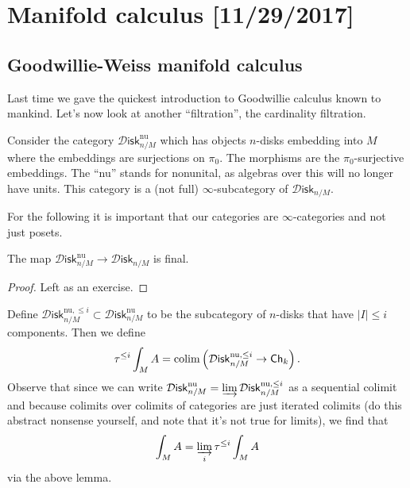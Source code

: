 \documentclass{amsart}
\begin{document}
\newpage

\section{Manifold calculus [11/29/2017]}

\subsection{Goodwillie-Weiss manifold calculus}

Last time we gave the quickest introduction to Goodwillie calculus known to mankind.
Let's now look at another ``filtration'', the cardinality filtration.

\begin{definition}
    Consider the category $\mathcal{D}\mathsf{isk}_{n/M}^\text{nu}$ which has objects
    $n$-disks embedding into $M$ where the embeddings are surjections on $\pi_0$. The
    morphisms are the $\pi_0$-surjective embeddings. The ``nu'' stands for nonunital,
    as algebras over this will no longer have units. This category is a (not full)
    $\infty$-subcategory of $\mathcal{D}\mathsf{isk}_{n/M}$.
\end{definition}

For the following it is important that our categories are $\infty$-categories and not
just posets.
\begin{lemma}
    The map $\mathcal{D}\mathsf{isk}_{n/M}^\text{nu}\to\mathcal{D}\mathsf{isk}_{n/M}$
    is final.
\end{lemma}
\begin{proof}
    Left as an exercise.
\end{proof}

Define $\mathcal{D}\mathsf{isk}_{n/M}^{\text{nu},\leq i}\subset \mathcal{D}\mathsf{isk}_{n/M}^\text{nu}$
to be the subcategory of $n$-disks that have $|I|\leq i$ components. Then we define
\begin{equation*}
    \tau^{\leq i}\int_M A = \operatorname*{colim}\left( \mathcal{D}\mathsf{isk}_{n/M}^{\text{nu},\leq i}\to \mathsf{Ch}_k \right).
\end{equation*}
Observe that since we can write $\mathcal{D}\mathsf{isk}_{n/M}^\text{nu}=\varinjlim \mathcal{D}\mathsf{isk}_{n/M}^{\text{nu},\leq i}$ 
as a sequential colimit and because colimits over colimits of categories are just iterated colimits (do this 
abstract nonsense yourself, and note that it's not true for limits), we find that
\begin{equation*}
    \int_M A = \varinjlim_{i}\tau^{\leq i}\int_MA
\end{equation*}
via the above lemma.
\end{document}
